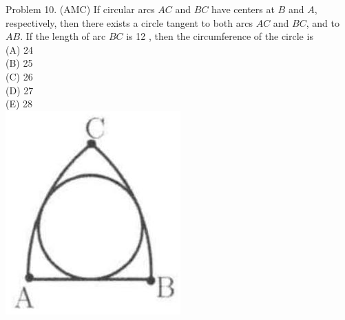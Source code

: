 \documentclass[10pt]{article}
\begin{document}
Problem 10. (AMC) If circular arcs \(A C\) and \(B C\) have centers at \(B\) and \(A\), respectively, then there exists a circle tangent to both arcs \(A C\) and \(B C\), and to \(A B\). If the length of arc \(B C\) is 12 , then the circumference of the circle is\\
(A) 24\\
(B) 25\\
(C) 26\\
(D) 27\\
(E) 28\\
\includegraphics[max width=\textwidth, center]{2025_04_17_97bc1f7e44d93c271a88g-208}
\end{document}
